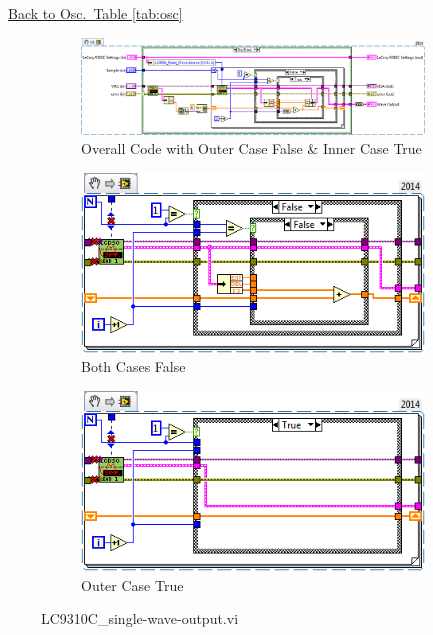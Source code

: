 \documentclass[11pt,a4paper,oldfontcommands]{memoir}
\begin{document}
\noindent\hrulefill\, \hyperref[tab:osc]{Back to Osc.\ Table \ref{tab:osc}}

\begin{figure}
	\begin{subfigure}[t]{\textheight}
		\includegraphics[width=\textheight,keepaspectratio]{LC931C_single-wave-output_blockdiagram_01}
		\caption{Overall Code with Outer Case False \& Inner Case True}
		\label{subfig:LC931C_single-wave-output_blkdig_01}
	\end{subfigure}%
	\vspace{1cm}
	\begin{subfigure}[t]{0.5\textheight}
		\includegraphics[width=0.45\textheight,keepaspectratio]{LC931C_single-wave-output_blockdiagram_02}
		\caption{Both Cases False}
		\label{subfig:LC931C_single-wave-output_blkdig_02}
	\end{subfigure}
	\begin{subfigure}[t]{0.5\textheight}
		\includegraphics[width=0.45\textheight,keepaspectratio]{LC931C_single-wave-output_blockdiagram_03}
		\caption{Outer Case True}
		\label{subfig:LC931C_single-wave-output_blkdig_03}
	\end{subfigure}
	\caption{LC9310C\_single-wave-output.vi}
	\label{fig:LC9310C_single-wave-output_blkdig-all}
\end{figure}
\end{document}
